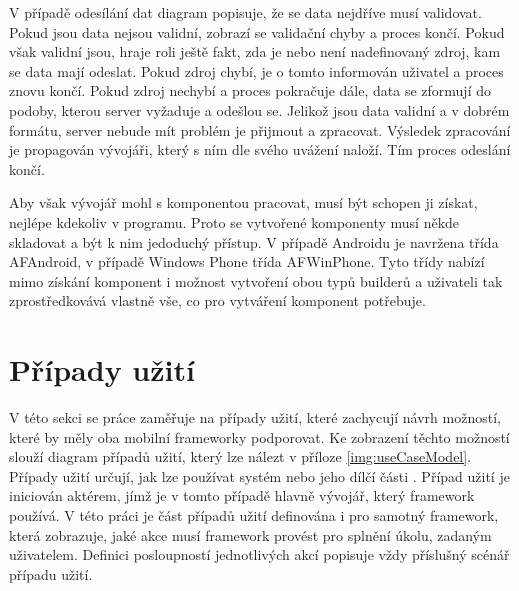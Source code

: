 V případě odesílání dat diagram popisuje, že se data nejdříve musí validovat. Pokud jsou data nejsou validní, zobrazí se validační chyby a proces končí. Pokud však validní jsou, hraje roli ještě fakt, zda je nebo není nadefinovaný zdroj, kam se data mají odeslat. Pokud zdroj chybí, je o tomto informován uživatel a proces znovu končí. Pokud zdroj nechybí a proces pokračuje dále, data se zformují do podoby, kterou server vyžaduje a odešlou se. Jelikož jsou data validní a v dobrém formátu, server nebude mít problém je přijmout a zpracovat. Výsledek zpracování je propagován vývojáři, který s ním dle svého uvážení naloží. Tím proces odeslání končí. 

Aby však vývojář mohl s komponentou pracovat, musí být schopen ji získat, nejlépe kdekoliv v programu. Proto se vytvořené komponenty musí někde skladovat a být k nim jedoduchý přístup. V případě Androidu je navržena třída AFAndroid, v případě Windows Phone třída AFWinPhone. Tyto třídy nabízí mimo získání komponent i možnost vytvoření obou typů builderů a uživateli tak zprostředkovává vlastně vše, co pro vytváření komponent potřebuje.

\section{Případy užití}
V této sekci se práce zaměřuje na případy užití, které zachycují návrh možností, které by měly oba mobilní frameworky podporovat. Ke zobrazení těchto možností slouží diagram případů užití, který lze nálezt v příloze \ref{img:useCaseModel}. Případy užití určují, jak lze používat systém nebo jeho dílčí části \cite{UmlArlow}. Případ užití je iniciován aktérem, jímž je v tomto případě hlavně vývojář, který framework používá. V této práci je část případů užití definována i pro samotný framework, která zobrazuje, jaké akce musí framework provést pro splnění úkolu, zadaným uživatelem. Definici posloupností jednotlivých akcí popisuje vždy příslušný scénář případu užití. 

